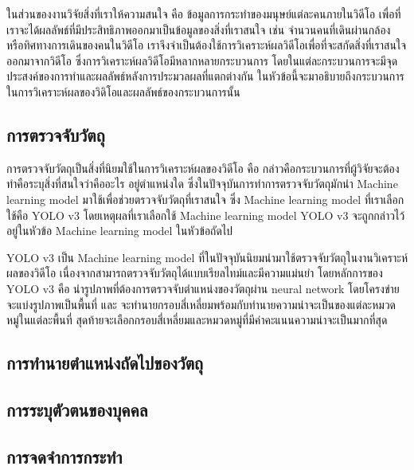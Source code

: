 ในส่วนของงานวิจัยสิ่งที่เราให้ความสนใจ คือ ข้อมูลการกระทำของมนุษย์แต่ละคนภายในวิดีโอ เพื่อที่เราจะได้ผลลัพธ์ที่มีประสิทธิภาพออกมาเป็นข้อมูลของสิ่งที่เราสนใจ เช่น จำนวนคนที่เดินผ่านกล้อง 
หรือทิศทางการเดินของคนในวิดีโอ เราจึงจำเป็นต้องใช้การวิเคราะห์ผลวิดีโอเพื่อที่จะสกัดสิ่งที่เราสนใจออกมาจากวิดีโอ ซึ่งการวิเคราะห์ผลวิดีโอมีหลากหลายกระบวนการ 
โดยในแต่ละกระบวนการจะมีจุดประสงค์ของการทำและผลลัพธ์หลังการประมวลผลที่แตกต่างกัน ในหัวข้อนี้จะมาอธิบายถึงกระบวนการในการวิเคราะห์ผลของวิดิโอและผลลัพธ์ของกระบวนการนั้น

\subsection{การตรวจจับวัตถุ}
การตรวจจับวัตถุเป็นสิ่งที่นิยมใช้ในการวิเคราะห์ผลของวิดีโอ คือ กล่าวคือกระบวนการที่ผู้วิจัยจะต้องทำคือระบุสิ่งที่สนใจว่าคืออะไร อยู่ตำแหน่งใด ซึ่งในปัจจุบันการทำการตรวจจับวัตถุมักนำ Machine learning model มาใช้เพื่อช่วยตรวจจับวัตถุที่เราสนใจ ซึ่ง Machine learning model ที่เราเลือกใช้คือ YOLO v3 โดยเหตุผลที่เราเลือกใช้ Machine learning model YOLO v3 จะถูกกล่าวไว้อยู่ในหัวข้อ Machine learning model ในหัวข้อถัดไป
\par
YOLO v3 เป็น Machine learning model ที่ในปัจจุบันนิยมนำมาใช้ตรวจจับวัตถุในงานวิเคราะห์ผลของวิดีโอ เนื่องจากสามารถตรวจจับวัตถุได้แบบเรียลไทม์และมีความแม่นยำ โดยหลักการของ YOLO v3 คือ นำรูปภาพที่ต้องการตรวจจับตำแหน่งของวัตถุผ่าน neural network โดยโครงข่ายจะแบ่งรูปภาพเป็นพื้นที่ และ จะทำนายกรอบสี่เหลี่ยมพร้อมกับทำนายความน่าจะเป็นของแต่ละหมวดหมู่ในแต่ละพื้นที่ สุดท้ายจะเลือกกรอบสี่เหลี่ยมและหมวดหมู่ที่มีค่าคะแนนความน่าจะเป็นมากที่สุด

\subsection{การทำนายตำแหน่งถัดไปของวัตถุ}


\subsection{การระบุตัวตนของบุคคล}


\subsection{การจดจำการกระทำ}
